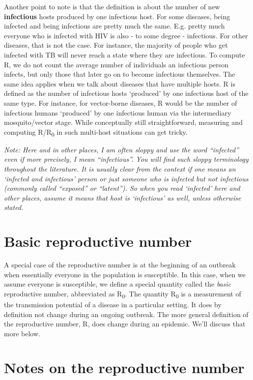 \documentclass[]{book}
\theoremstyle{definition}
\theoremstyle{definition}
\theoremstyle{definition}
\theoremstyle{remark}
\begin{document}
Another point to note is that the definition is about the number of new
\textbf{infectious} hosts produced by one infectious host. For some
diseases, being infected and being infectious are pretty much the same.
E.g. pretty much everyone who is infected with HIV is also - to some
degree - infectious. For other diseases, that is not the case. For
instance, the majority of people who get infected with TB will never
reach a state where they are infectious. To compute R, we do not count
the average number of individuals an infectious person infects, but only
those that later go on to become infectious themselves. The same idea
applies when we talk about diseases that have multiple hosts. R is
defined as the number of infectious hosts `produced' by one infectious
host of the same type. For instance, for vector-borne diseases, R would
be the number of infectious humans `produced' by one infectious human
via the intermediary mosquito/vector stage. While conceptually still
straightforward, measuring and computing R/R\textsubscript{0} in such
multi-host situations can get tricky.

\emph{Note: Here and in other places, I am often sloppy and use the word
``infected'' even if more precisely, I mean ``infectious''. You will
find such sloppy terminology throughout the literature. It is usually
clear from the context if one means an `infected and infectious' person
or just someone who is infected but not infectious (commonly called
``exposed'' or ``latent''). So when you read `infected' here and other
places, assume it means that host is `infectious' as well, unless
otherwise stated.}

\section{Basic reproductive number}\label{basic-reproductive-number}

A special case of the reproductive number is at the beginning of an
outbreak when essentially everyone in the population is susceptible. In
this case, when we assume everyone is susceptible, we define a special
quantity called the \emph{basic} reproductive number, abbreviated as
R\textsubscript{0}. The quantity R\textsubscript{0} is a measurement of
the transmission potential of a disease in a particular setting. It does
by definition not change during an ongoing outbreak. The more general
definition of the reproductive number, R, does change during an
epidemic. We'll discuss that more below.

\section{Notes on the reproductive
number}\label{notes-on-the-reproductive-number}
\end{document}
